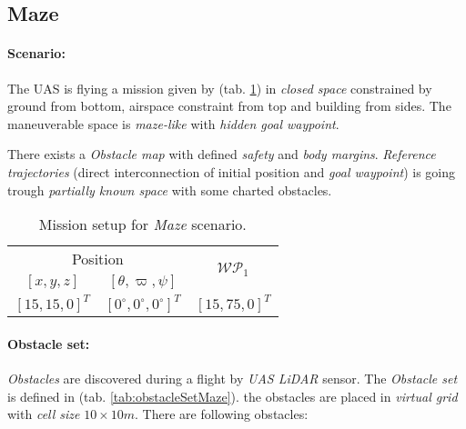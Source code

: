 \subsection{Maze}\label{s:testMaze}

\paragraph{Scenario:} The UAS is flying a mission given by (tab. \ref{tab:missionSetupMazeScenario}) in \emph{closed space} constrained by ground from bottom, airspace constraint from top and building from sides. The maneuverable space is \emph{maze-like} with  \emph{hidden goal waypoint}.

There exists a \emph{Obstacle map} with defined \emph{safety} and \emph{body margins}. \emph{Reference trajectories} (direct interconnection of initial position and \emph{goal waypoint}) is going trough \emph{partially known space} with some charted obstacles.

\begin{table}[H]
    \centering
    \begin{tabular}{c|c||c}
        \multicolumn{2}{c||}{Position} & \multirow{2}{*}{$\mathscr{WP}_1$} \\\cline{1-2}
        $[x,y,z]$           & $[\theta,\varpi,\psi]$           & \\\hline\hline
        $[15,15,0]^T $        & $[0^\circ,0^\circ,0^\circ]^T$    & $[15,75,0]^T$        \\ 
    \end{tabular}
    \caption{Mission setup for \emph{Maze} scenario.}
    \label{tab:missionSetupMazeScenario}
\end{table}

\paragraph{Obstacle set:} \emph{Obstacles} are discovered during a flight by \emph{UAS LiDAR} sensor. The \emph{Obstacle set} is defined in (tab. \ref{tab:obstacleSetMaze}). the obstacles are placed in \emph{virtual grid} with \emph{cell size} $10 \times 10 m$. There are following obstacles:

